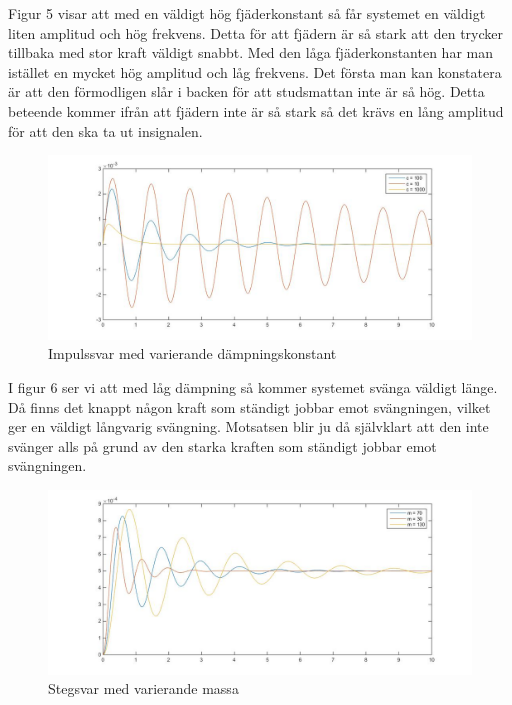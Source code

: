 \documentclass[10pt,a4paper]{article}
\begin{document}
Figur 5 visar att med en väldigt hög fjäderkonstant så får systemet en väldigt liten amplitud och hög frekvens. Detta för att fjädern är så stark att den trycker tillbaka med stor kraft väldigt snabbt. Med den låga fjäderkonstanten har man istället en mycket hög amplitud och låg frekvens. Det första man kan konstatera är att den förmodligen slår i backen för att studsmattan inte är så hög. Detta beteende kommer ifrån att fjädern inte är så stark så det krävs en lång amplitud för att den ska ta ut insignalen. 

\begin{figure}[h]
\begin{center}
\includegraphics[scale=0.4]{impulssvar(dampning)}
\caption{Impulssvar med varierande dämpningskonstant}
\end{center}
\end{figure}

I figur 6 ser vi att med låg dämpning så kommer systemet svänga väldigt länge. Då finns det knappt någon kraft som ständigt jobbar emot svängningen, vilket ger en väldigt långvarig svängning. Motsatsen blir ju då självklart att den inte svänger alls på grund av den starka kraften som ständigt jobbar emot svängningen.
\newpage

\begin{figure}[h]
\begin{center}
\includegraphics[scale=0.4]{stegsvar(massa)}
\caption{Stegsvar med varierande massa}
\end{center}
\end{figure}
\end{document}
